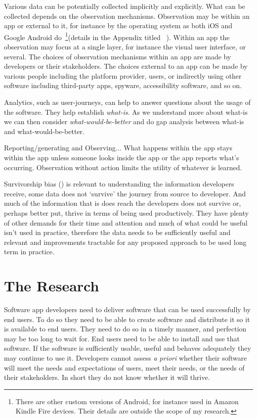 Various data can be potentially collected implicitly and explicitly. What can be collected depends on the observation mechanisms. Observation may be within an app or external to it, for instance by the operating system as both iOS  and Google Android do~\footnote{There are other custom versions of Android, for instance used in Amazon Kindle Fire devices. Their details are outside the scope of my research.}(details in the Appendix titled~\href{chapter-on-mobile-analytics}{\emph{}} ). Within an app the observation may focus at a single layer, for instance the visual user interface, or several. The choices of observation mechanisms within an app are made by developers or their stakeholders. The choices external to an app can be made by various people including the platform provider, users, or indirectly using other software including third-party apps, spyware, accessibility software, and so on.

Analytics, such as user-journeys, can help to answer questions about the usage of the software. They help establish \emph{what-is}. As we understand more about what-is we can then consider \emph{what-would-be-better} and do gap analysis between what-is and what-would-be-better.

Reporting/generating and Observing... What happens within the app stays within the app unless someone looks inside the app or the app reports what's occurring. Observation without action limits the utility of whatever is learned. 

Survivorship bias (\cite{wikipedia_survivorship_bias}) is relevant to understanding the information developers receive, some data does not `survive' the journey from source to developer. And much of the information that is does reach the developers does not survive or, perhaps better put, thrive in terms of being used productively. They have plenty of other demands for their time and attention and much of what could be useful isn't used in practice, therefore the data needs to be sufficiently useful and relevant and improvements tractable for any proposed approach to be used long term in practice.



\section{The Research}
Software app developers need to deliver software that can be used successfully by end users. To do so they need to be able to create software and distribute it so it is available to end users. They need to do so in a timely manner, and perfection may be too long to wait for. End users need to be able to install and use that software. If the software is sufficiently usable, useful and behaves adequately they may continue to use it. Developers cannot assess \emph{a priori} whether their software will meet the needs and expectations of users, meet their needs, or the needs of their stakeholders. In short they do not know whether it will thrive.

